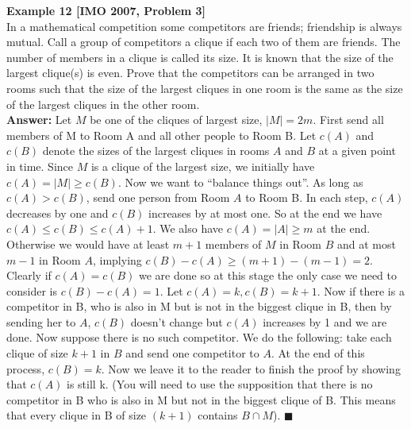 \documentclass[a4paper,11pt]{book}
\begin{document}
\textbf{Example 12 [IMO 2007, Problem 3]}\\
In a mathematical competition some competitors are friends;
friendship is always mutual. Call a group of competitors a clique if
each two of them are friends. The number of members in a clique
is called its size. It is known that the size of the largest clique(s) is
even. Prove that the competitors can be arranged in two rooms
such that the size of the largest cliques in one room is the same as
the size of the largest cliques in the other room.\\
\textbf{ Answer:}
Let $M$ be one of the cliques of largest size, $|M| = 2m$. First send all
members of M to Room A and all other people to Room B. Let $ c(A)$
and $c(B)$ denote the sizes of the largest cliques in rooms $A$ and $ B$ at
a given point in time. Since $M$ is a clique of the largest size, we
initially have $c(A) =|M| \ge c(B)$. Now we want to “balance things
out”. As long as $c(A) > c(B)$, send one person from Room $A$ to
Room B. In each step, $c(A)$ decreases by one and $c(B)$ increases by
at most one. So at the end we have $c(A) \le c(B) \le c(A) + 1$. We also
have $c(A) = |A| \ge m$ at the end. Otherwise we would have at least
$m+1$ members of $M$ in Room $B$ and at most $m−1$ in Room $A$,
implying $c(B)-c(A) \ge (m+1)−(m−1) = 2$.
Clearly if $c(A) = c(B)$ we are done so at this stage the only case
we need to consider is $c(B) - c(A) = 1$. Let $c(A) = k, c(B) = k+1$. Now
if there is a competitor in B, who is also in M but is not in the
biggest clique in B, then by sending her to $A$, $c(B)$ doesn’t change
but $c(A)$ increases by 1 and we are done. Now suppose there is no
such competitor. We do the following: take each clique of size $k+1$
in $B$ and send one competitor to $A$. At the end of this process, $c(B)
= k$. Now we leave it to the reader to finish the proof by showing
that $c(A)$ is still k. (You will need to use the supposition that there
is no competitor in B who is also in M but not in the biggest clique
of B. This means that every clique in B of size $(k+1)$ contains
$B\cap M$). \hfill $\blacksquare$\\
\end{document}
